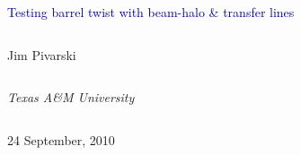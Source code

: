 \documentclass[compress]{beamer}
\begin{document}
\begin{frame}
\vfill
\begin{center}
\textcolor{darkblue}{\Large Testing barrel twist with beam-halo \& transfer lines}

\vfill
\begin{columns}
\begin{center}
\large
Jim Pivarski
\end{center}
\end{columns}

\begin{columns}
\begin{center}
\scriptsize
{\it Texas A\&M University}
\end{center}
\end{columns}

\vfill
24 September, 2010

\end{center}
\end{frame}


\small
\end{document}
